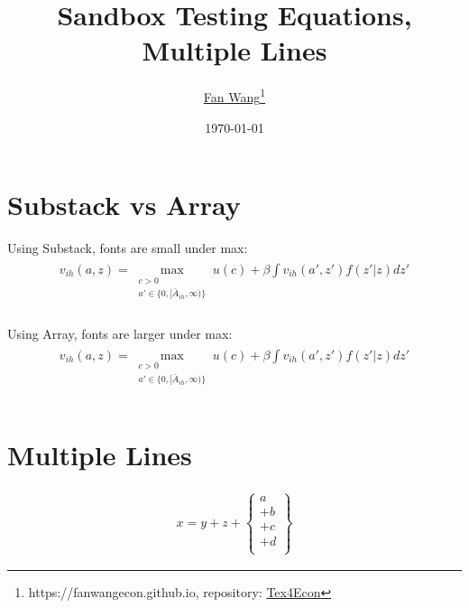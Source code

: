 \documentclass[12pt,english]{article}
\title{Sandbox Testing Equations, Multiple Lines}
\author{\href{https://fanwangecon.github.io/}{Fan Wang}\thanks{https://fanwangecon.github.io, repository: \href{https://fanwangecon.github.io/Tex4Econ/}{Tex4Econ}}}
\date{\today}
\begin{document}
\maketitle

\section{Substack vs Array}

Using Substack, fonts are small under max:
\begin{align}
    \begin{split}
        \label{eq:Value}
        v_{ih}\left(a,z\right)
        =
        \max_{
            \substack{
                c>0\\
                a' \in \{0,[\bar{A}_{ih},\infty)\}
                }
            }
        u\left(c\right)+  \beta \int v_{ih}\left(a',z'\right)f(z'|z)dz'\\
    \end{split}
\end{align}

Using Array, fonts are larger under max:
\begin{align}
    \begin{split}
        \label{eq:Value}
        v_{ih}\left(a,z\right)
        =
        \max_{
            \begin{array}{cc}
                c>0\\
                a' \in \{0,[\bar{A}_{ih},\infty)\}\\
            \end{array}
            }
        u\left(c\right)+  \beta \int v_{ih}\left(a',z'\right)f(z'|z)dz'\\
    \end{split}
\end{align}

\section{Multiple Lines}

\begin{align}
    x = y + z +
    \left\{
      \begin{array}{l}
            a \\
            + b \\
            + c \\
            + d \\
      \end{array}
    \right\}
\end{align}
\end{document}
